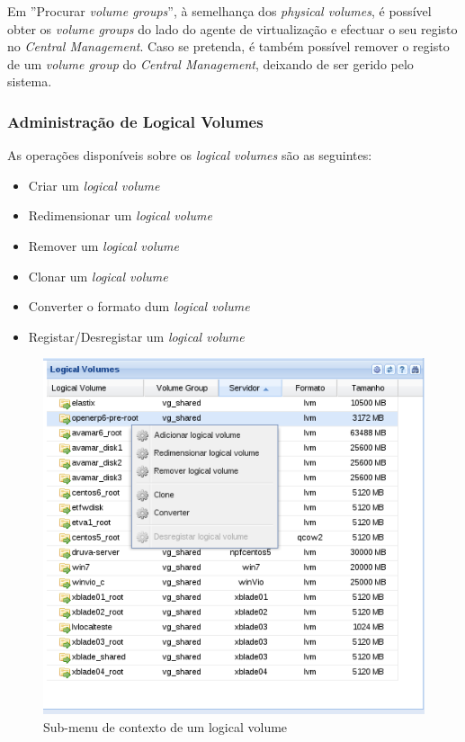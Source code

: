 Em ''Procurar \emph{volume groups}'', à semelhança dos \emph{physical volumes}, é possível obter os \emph{volume groups} do lado do agente de virtualização e efectuar o seu registo no \emph{Central Management}.
Caso se pretenda, é também possível remover o registo de um \emph{volume group} do \emph{Central Management}, deixando de ser gerido pelo sistema.


\subsubsection{Administração de Logical Volumes}

As operações disponíveis sobre os \emph{logical volumes} são as seguintes:
\begin{itemize}
	\item Criar um \emph{logical volume}
	\item Redimensionar um \emph{logical volume}
	\item Remover um \emph{logical volume}
	\item Clonar um \emph{logical volume}
	\item Converter o formato dum \emph{logical volume}
    \item Registar/Desregistar um \emph{logical volume}
\end{itemize}

\begin{figure}[H]
        \begin{center}
        \includegraphics[scale=0.45]{screenshots/node_storage_lv_ctx.png}
        \caption{Sub-menu de contexto de um logical volume}
        \label{fig:storage_lv_ctx}
        \end{center}
\end{figure}

